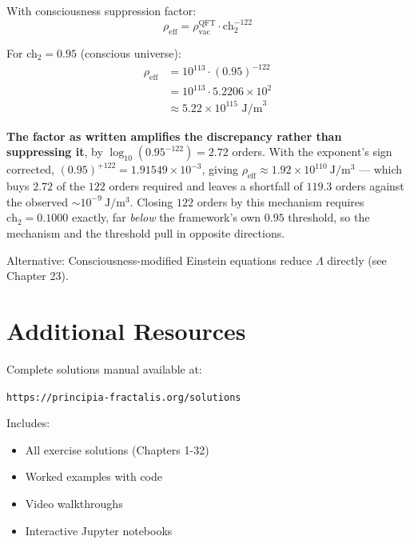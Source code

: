 With consciousness suppression factor:
\begin{equation}
\rho_{\text{eff}} = \rho_{\text{vac}}^{\text{QFT}} \cdot \text{ch}_2^{-122}
\end{equation}

For ch$_2 = 0.95$ (conscious universe):
\begin{align}
\rho_{\text{eff}} &= 10^{113} \cdot (0.95)^{-122} \\
&= 10^{113} \cdot 5.2206 \times 10^{2} \\
&\approx 5.22 \times 10^{115} \text{ J/m}^3
\end{align}

\textbf{The factor as written amplifies the discrepancy rather than suppressing
it}, by $\log_{10}(0.95^{-122}) = 2.72$ orders. With the exponent's sign
corrected, $(0.95)^{+122} = 1.91549\times10^{-3}$, giving
$\rho_{\text{eff}} \approx 1.92\times10^{110}\ \mathrm{J/m^3}$ --- which buys
$2.72$ of the $122$ orders required and leaves a shortfall of $119.3$ orders
against the observed $\sim 10^{-9}\ \mathrm{J/m^3}$. Closing $122$ orders by this
mechanism requires $\text{ch}_2 = 0.1000$ exactly, far \emph{below} the
framework's own $0.95$ threshold, so the mechanism and the threshold pull in
opposite directions.

Alternative: Consciousness-modified Einstein equations reduce $\Lambda$ directly (see Chapter 23).

\section{Additional Resources}

Complete solutions manual available at:
\begin{center}
\texttt{https://principia-fractalis.org/solutions}
\end{center}

Includes:
\begin{itemize}
\item All exercise solutions (Chapters 1-32)
\item Worked examples with code
\item Video walkthroughs
\item Interactive Jupyter notebooks
\end{itemize}